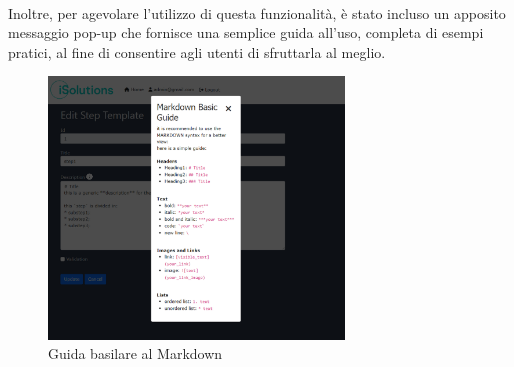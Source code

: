 \\
Inoltre, per agevolare l'utilizzo di questa funzionalità, è stato incluso un apposito 
messaggio pop-up che fornisce una semplice guida all'uso, completa di esempi pratici, 
al fine di consentire agli utenti di sfruttarla al meglio.
\begin{figure}[ht]
	\centering
	\includegraphics[width=0.7\textwidth]{img/markdownGuide.png}
	\caption{Guida basilare al Markdown}
	\label{fig:one}
\end{figure}